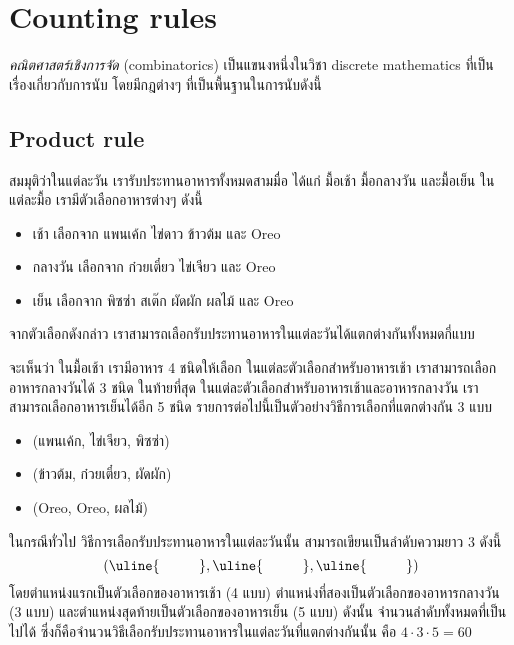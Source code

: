 \section{Counting rules}
\emph{คณิตศาสตร์เชิงการจัด} (combinatorics) เป็นแขนงหนึ่งในวิชา discrete mathematics ที่เป็นเรื่องเกี่ยวกับการนับ โดยมีกฎต่างๆ ที่เป็นพื้นฐานในการนับดังนี้

\subsection{Product rule}
\begin{example}\label{ex:meal-combos}
สมมุติว่าในแต่ละวัน เรารับประทานอาหารทั้งหมดสามมื่อ ได้แก่ มื้อเช้า มื้อกลางวัน และมื้อเย็น \enskip ในแต่ละมื้อ เรามีตัวเลือกอาหารต่างๆ ดังนี้
\begin{itemize}[]
\item เช้า เลือกจาก แพนเค้ก ไข่ดาว ข้าวต้ม และ Oreo
\item กลางวัน เลือกจาก ก๋วยเตี๋ยว ไข่เจียว และ Oreo
\item เย็น เลือกจาก พิซซ่า สเต๊ก ผัดผัก ผลไม้ และ Oreo
\end{itemize}
จากตัวเลือกดังกล่าว เราสามารถเลือกรับประทานอาหารในแต่ละวันได้แตกต่างกันทั้งหมดกี่แบบ

จะเห็นว่า ในมื้อเช้า เรามีอาหาร 4 ชนิดให้เลือก \enskip ในแต่ละตัวเลือกสำหรับอาหารเช้า เราสามารถเลือกอาหารกลางวันได้ 3 ชนิด \enskip ในท้ายที่สุด ในแต่ละตัวเลือกสำหรับอาหารเช้าและอาหารกลางวัน เราสามารถเลือกอาหารเย็นได้อีก 5 ชนิด \enskip รายการต่อไปนี้เป็นตัวอย่างวิธีการเลือกที่แตกต่างกัน 3 แบบ
\begin{itemize}[]
\item (แพนเค้ก, ไข่เจียว, พิซซ่า)
\item (ข้าวต้ม, ก๋วยเตี๋ยว, ผัดผัก)
\item (Oreo, Oreo, ผลไม้)
\end{itemize}

ในกรณีทั่วไป วิธีการเลือกรับประทานอาหารในแต่ละวันนั้น สามารถเขียนเป็นลำดับความยาว 3 ดังนี้
\[(\uline{\hspace*{1cm}},\uline{\hspace*{1cm}},\uline{\hspace*{1cm}})\]
โดยตำแหน่งแรกเป็นตัวเลือกของอาหารเช้า (4 แบบ) ตำแหน่งที่สองเป็นตัวเลือกของอาหารกลางวัน (3 แบบ) และตำแหน่งสุดท้ายเป็นตัวเลือกของอาหารเย็น (5 แบบ) \enskip ดังนั้น จำนวนลำดับทั้งหมดที่เป็นไปได้ ซึ่งก็คือจำนวนวิธีเลือกรับประทานอาหารในแต่ละวันที่แตกต่างกันนั้น คือ $4\cdot 3\cdot 5=60$
\end{example}

